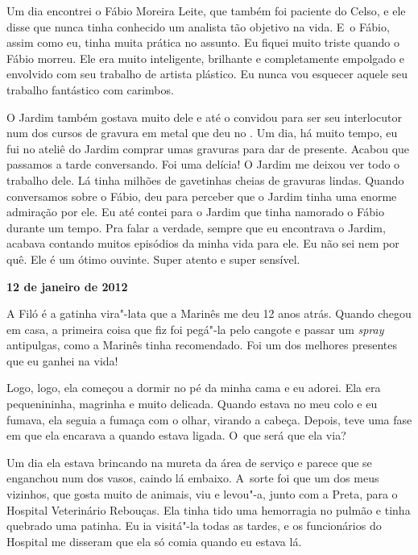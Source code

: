 Um dia encontrei o Fábio Moreira Leite, que também foi paciente do
Celso, e ele disse que nunca tinha conhecido um analista tão objetivo na
vida. E~o Fábio, assim como eu, tinha muita prática no assunto. Eu
fiquei muito triste quando o Fábio morreu. Ele era muito inteligente,
brilhante e completamente empolgado e envolvido com seu trabalho de
artista plástico. Eu nunca vou esquecer aquele seu trabalho fantástico
com carimbos.

O Jardim também gostava muito dele e até o convidou para ser seu
interlocutor num dos cursos de gravura em metal que deu no . Um
dia, há muito tempo, eu fui no ateliê do Jardim comprar umas gravuras
para dar de presente. Acabou que passamos a tarde conversando. Foi uma
delícia! O Jardim me deixou ver todo o trabalho dele. Lá tinha milhões
de gavetinhas cheias de gravuras lindas. Quando conversamos sobre o
Fábio, deu para perceber que o Jardim tinha uma enorme admiração por
ele. Eu até contei para o Jardim que tinha namorado o Fábio durante um
tempo. Pra falar a verdade, sempre que eu encontrava o Jardim, acabava
contando muitos episódios da minha vida para ele. Eu não sei nem por
quê. Ele é um ótimo ouvinte. Super atento e super sensível.

\begin{center}\asterisc{}\end{center}


\begin{flushright}\textbf{12 de janeiro de 2012}\end{flushright}


A Filó é a gatinha vira"-lata que a Marinês me deu 12 anos atrás. Quando
chegou em casa, a primeira coisa que fiz foi pegá"-la pelo cangote e
passar um \emph{spray} antipulgas, como a Marinês tinha recomendado. Foi
um dos melhores presentes que eu ganhei na vida!

Logo, logo, ela começou a dormir no pé da minha cama e eu adorei. Ela
era pequenininha, magrinha e muito delicada. Quando estava no meu colo
e eu fumava, ela seguia a fumaça com o olhar, virando a cabeça. Depois,
teve uma fase em que ela encarava a  quando estava ligada. O~que será
que ela via?

Um dia ela estava brincando na mureta da área de serviço e parece que
se enganchou num dos vasos, caindo lá embaixo. A~sorte foi que um dos
meus vizinhos, que gosta muito de animais, viu e levou"-a, junto com a
Preta, para o Hospital Veterinário Rebouças. Ela tinha tido uma
hemorragia no pulmão e tinha quebrado uma patinha. Eu ia visitá"-la todas
as tardes, e os funcionários do Hospital me disseram que ela só comia
quando eu estava lá.

